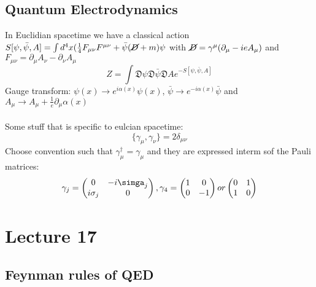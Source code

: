 \documentclass{article}
\begin{document}
    \subsection{Quantum Electrodynamics}
    In Euclidian spacetime we have a classical action $S[\psi, \bar \psi, A] = \int d^4 x ( \frac{1}{4} F_{\mu \nu} F^{\mu \nu} + \bar \psi ( \cancel D + m) \psi$ with $\cancel D = \gamma^{\mu}( \partial_{\mu} - ie A_{\mu})$ and $F_{\mu \nu} = \partial_{\mu} A_{\nu} - \partial_{\nu} A_{\mu}$
    $$
    Z = \int \mathfrak{D} \psi \mathfrak{D} \bar \psi \mathfrak{D} A e^{- S[ \psi, \bar \psi, A]}
    $$
     Gauge transform: $\psi(x) \rightarrow e^{i \alpha(x)} \psi(x)$, $\bar \psi \rightarrow e^{-i \alpha(x)} \bar \psi$ and $A_{\mu} \rightarrow A_{\mu} + \frac{1}{e} \partial_{\mu} \alpha(x)$
     \\\\
     Some stuff that is specific to eulcian spacetime:
     $$
      \{ \gamma_{\mu}, \gamma_{\nu} \} = 2 \delta_{\mu \nu}
     $$
      Choose convention such that $\gamma_{\mu}^{\dagger} = \gamma_{\mu}$ and they are expressed interm sof the Pauli matrices:
      $$
       \gamma_j = \begin{pmatrix} 0 & - i \simga_j \\ i \sigma_j & 0 \end{pmatrix}, \gamma_4 = \begin{pmatrix} 1 & 0 \\ 0 & -1 \end{pmatrix} or \begin{pmatrix} 0 & 1 \\ 1 & 0 \end{pmatrix}
      $$
      \section{Lecture 17}
      \subsection{Feynman rules of QED}
\end{document}
